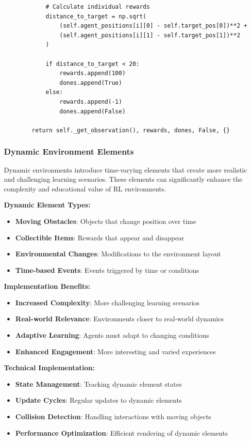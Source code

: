 \documentclass[12pt]{article}
\begin{document}
{{{\begin{verbatim}
            # Calculate individual rewards
            distance_to_target = np.sqrt(
                (self.agent_positions[i][0] - self.target_pos[0])**2 + 
                (self.agent_positions[i][1] - self.target_pos[1])**2
            )
            
            if distance_to_target < 20:
                rewards.append(100)
                dones.append(True)
            else:
                rewards.append(-1)
                dones.append(False)
                
        return self._get_observation(), rewards, dones, False, {}
\end{verbatim}

\subsubsection{Dynamic Environment Elements}

Dynamic environments introduce time-varying elements that create more realistic and challenging learning scenarios. These elements can significantly enhance the complexity and educational value of RL environments.

\textbf{Dynamic Element Types:}
\begin{itemize}
    \item \textbf{Moving Obstacles}: Objects that change position over time
    \item \textbf{Collectible Items}: Rewards that appear and disappear
    \item \textbf{Environmental Changes}: Modifications to the environment layout
    \item \textbf{Time-based Events}: Events triggered by time or conditions
\end{itemize}

\textbf{Implementation Benefits:}
\begin{itemize}
    \item \textbf{Increased Complexity}: More challenging learning scenarios
    \item \textbf{Real-world Relevance}: Environments closer to real-world dynamics
    \item \textbf{Adaptive Learning}: Agents must adapt to changing conditions
    \item \textbf{Enhanced Engagement}: More interesting and varied experiences
\end{itemize}

\textbf{Technical Implementation:}
\begin{itemize}
    \item \textbf{State Management}: Tracking dynamic element states
    \item \textbf{Update Cycles}: Regular updates to dynamic elements
    \item \textbf{Collision Detection}: Handling interactions with moving objects
    \item \textbf{Performance Optimization}: Efficient rendering of dynamic elements
\end{itemize}

}}}
\end{document}
